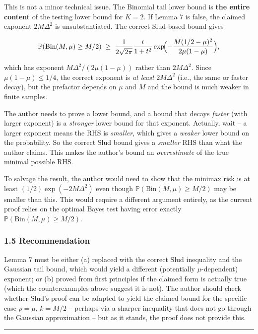 \documentclass[
  12pt,
]{article}
\begin{document}
This is not a minor technical issue. The Binomial tail lower bound is
\textbf{the entire content} of the testing lower bound for \(K=2\). If
Lemma 7 is false, the claimed exponent \(2M\Delta^2\) is
unsubstantiated. The correct Slud-based bound gives

\[\mathbb{P}(\text{Bin}(M,\mu) \geq M/2) \;\geq\; \frac{1}{2\sqrt{2\pi}}\frac{t}{1+t^2}\exp\!\Bigl(-\frac{M(1/2-\mu)^2}{2\mu(1-\mu)}\Bigr),\]

which has exponent \(M\Delta^2/(2\mu(1-\mu))\) rather than
\(2M\Delta^2\). Since \(\mu(1-\mu) \leq 1/4\), the correct exponent is
\emph{at least} \(2M\Delta^2\) (i.e., the same or faster decay), but the
prefactor depends on \(\mu\) and \(M\) and the bound is much weaker in
finite samples.

The author needs to prove a lower bound, and a bound that decays
\emph{faster} (with larger exponent) is a \emph{stronger} lower bound
for that exponent. Actually, wait -- a larger exponent means the RHS is
\emph{smaller}, which gives a \emph{weaker} lower bound on the
probability. So the correct Slud bound gives a \emph{smaller} RHS than
what the author claims. This makes the author's bound an
\emph{overestimate} of the true minimal possible RHS.

To salvage the result, the author would need to show that the minimax
risk is at least \((1/2)\exp(-2M\Delta^2)\) even though
\(\mathbb{P}(\text{Bin}(M,\mu) \geq M/2)\) may be smaller than this.
This would require a different argument entirely, as the current proof
relies on the optimal Bayes test having error exactly
\(\mathbb{P}(\text{Bin}(M,\mu) \geq M/2)\).

\subsubsection{1.5 Recommendation}\label{recommendation}

Lemma 7 must be either (a) replaced with the correct Slud inequality and
the Gaussian tail bound, which would yield a different (potentially
\(\mu\)-dependent) exponent; or (b) proved from first principles if the
claimed form is actually true (which the counterexamples above suggest
it is not). The author should check whether Slud's proof can be adapted
to yield the claimed bound for the specific case \(p=\mu\), \(k=M/2\) --
perhaps via a sharper inequality that does not go through the Gaussian
approximation -- but as it stands, the proof does not provide this.

\begin{center}\rule{0.5\linewidth}{0.5pt}\end{center}
\end{document}
